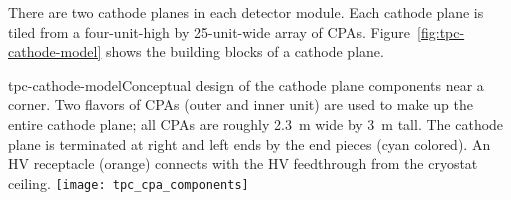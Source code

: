 There are two cathode planes in each detector module.  Each cathode plane is 
tiled from a four-unit-high by 25-unit-wide array of CPAs. Figure~\ref{fig:tpc-cathode-model} shows the
building blocks of a cathode plane.  
\begin{cdrfigure} 
{tpc-cathode-model}{Conceptual design of the cathode plane 
components near a corner.  Two flavors of CPAs (outer 
and inner unit) are used to make up the entire cathode plane; all
CPAs are roughly 2.3~m wide by 3~m tall. 
The cathode plane is terminated at
right and left ends by the end pieces (cyan colored).  An HV receptacle 
(orange) connects with the HV feedthrough from the cryostat ceiling. }
\texttt{[image: tpc\_cpa\_components]}
\end{cdrfigure}

